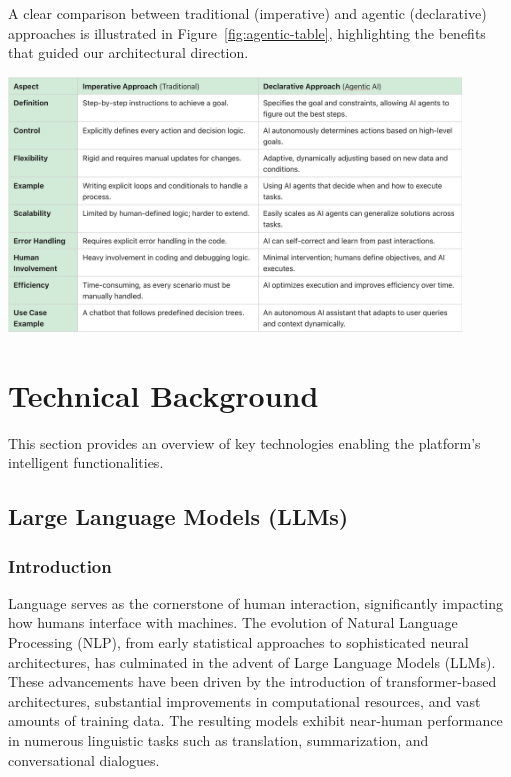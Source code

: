 A clear comparison between traditional (imperative) and agentic (declarative) approaches is illustrated in Figure~\ref{fig:agentic-table}, highlighting the benefits that guided our architectural direction.

\begin{center}
    \centering
    \includegraphics[width=0.9\textwidth]{Images/imperative_declarative_approach.png}
     \cite{agenticTable}
    \label{fig:agentic-table}
\end{center}


\section{Technical Background}
This section provides an overview of key technologies enabling the platform's intelligent functionalities.

\subsection{Large Language Models (LLMs)}

\subsubsection{Introduction}
Language serves as the cornerstone of human interaction, significantly impacting how humans interface with machines. The evolution of Natural Language Processing (NLP), from early statistical approaches to sophisticated neural architectures, has culminated in the advent of Large Language Models (LLMs). These advancements have been driven by the introduction of transformer-based architectures, substantial improvements in computational resources, and vast amounts of training data. The resulting models exhibit near-human performance in numerous linguistic tasks such as translation, summarization, and conversational dialogues.

